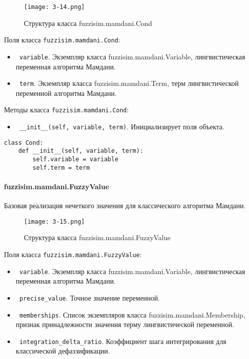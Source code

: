 \begin{figure}[ht]
	\centering
	\texttt{[image: 3-14.png]}
	\caption{ Структура класса fuzzisim.mamdani.Cond}
\end{figure}

Поля класса \lstinline!fuzzisim.mamdani.Cond!:
\begin{itemize}
	\item \lstinline! variable!. Экземпляр класса  fuzzisim.mamdani.Variable, лингвистическая переменная алгоритма Мамдани.
	\item \lstinline! term!.   Экземпляр класса  fuzzisim.mamdani.Term, терм лингвистической переменной алгоритма Мамдани.
\end{itemize}


Методы класса \lstinline!fuzzisim.mamdani.Cond!:
\begin{itemize}
	\item \lstinline! __init__(self, variable, term)!. Инициализирует поля объекта.
\end{itemize}

\begin{lstlisting}[style=pythonstyle,caption={  }, label=lst:func:1]
class Cond:
	def __init__(self, variable, term):
		self.variable = variable
		self.term = term
\end{lstlisting}



\paragraph{fuzzisim.mamdani.FuzzyValue}

Базовая реализация нечеткого значения для классического алгоритма Мамдани.

\begin{figure}[ht]
	\centering
	\texttt{[image: 3-15.png]}
	\caption{ Структура класса fuzzisim.mamdani.FuzzyValue}
\end{figure}

Поля класса \lstinline!fuzzisim.mamdani.FuzzyValue!:
\begin{itemize}
	\item \lstinline! variable!. Экземпляр класса  fuzzisim.mamdani.Variable, лингвистическая переменная алгоритма Мамдани.
	\item \lstinline! precise_value!.   Точное значение переменной.
	\item \lstinline! memberships!. Список экземпляров класса   fuzzisim.mamdani.Membership, признак принадлежности значения терму лингвистической переменной.
	\item \lstinline! integration_delta_ratio!.   Коэффициент шага интегрирования для классической дефаззификации.
\end{itemize}


